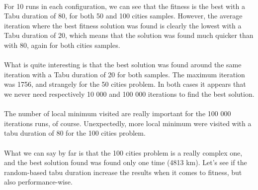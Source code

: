 \documentclass[12pt,oneside,a4paper]{article}
\begin{document}
  \begin{table}[h]
    \caption{Parameters found with the first version configuration at each run for  Duration\_Tabou equals to 80}
  \end{table}
  \paragraph{}
  For 10 runs in each configuration, we can see that the fitness is the best 
  with a Tabu duration of 80, for both 50 and 100 cities samples. However, 
  the average iteration where the best fitness solution was found is clearly the 
  lowest with a Tabu duration of 20, which means that the solution was found much quicker 
  than with 80, again for both cities samples. 
  \paragraph{}What is quite interesting is that the best solution 
  was found around the same iteration with a Tabu duration of 20 for both samples. The maximum 
  iteration was 1756, and strangely for the 50 cities problem. In both cases it appears that we 
  never need respectively 10 000 and 100 000 iterations to find the best solution.
\paragraph{}The number of local minimum visited are really important for the 100 000 iterations runs, 
of course. Unexpectedly, more local minimum were visited with a tabu duration of 80 for 
the 100 cities problem.
\paragraph{}What we can say by far is that the 100 cities problem is a really complex one, and the best 
solution found was found only one time (4813 km). Let’s see if the random-based tabu duration
 increase the results when it comes to fitness, but also performance-wise.
\end{document}
